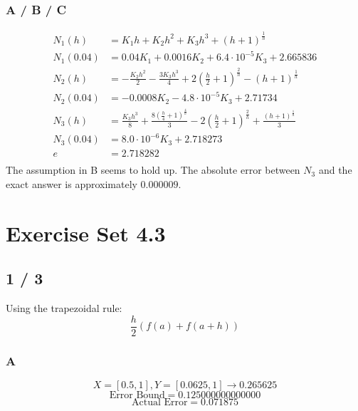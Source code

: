 \documentclass{oisinclass}
\begin{document}
\subsubsection*{A / B / C}
\begin{align*}
	N_1(h)    & = K_{1} h + K_{2} h^{2} + K_{3} h^{3} + \left(h + 1\right)^{\frac{1}{h}}                                                                                                     \\
	N_1(0.04) & = 0.04 K_{1} + 0.0016 K_{2} + 6.4 \cdot 10^{-5} K_{3} + 2.665836                                                                                                             \\
	N_2(h)    & = - \frac{K_{2} h^{2}}{2} - \frac{3 K_{3} h^{3}}{4} + 2 \left(\frac{h}{2} + 1\right)^{\frac{2}{h}} - \left(h + 1\right)^{\frac{1}{h}}                                        \\
	N_2(0.04) & = - 0.0008 K_{2} - 4.8 \cdot 10^{-5} K_{3} + 2.71734                                                                                                                         \\
	N_3(h)    & = \frac{K_{3} h^{3}}{8} + \frac{8 \left(\frac{h}{4} + 1\right)^{\frac{4}{h}}}{3} - 2 \left(\frac{h}{2} + 1\right)^{\frac{2}{h}} + \frac{\left(h + 1\right)^{\frac{1}{h}}}{3} \\
	N_3(0.04) & = 8.0 \cdot 10^{-6} K_{3} + 2.718273                                                                                                                                         \\
	e         & = 2.718282                                                                                                                                                                   \\
\end{align*}
The assumption in B seems to hold up. The absolute error between \(N_3\) and the exact answer is approximately \(0.000009\).

\section*{Exercise Set 4.3}
\subsection*{1 / 3}
Using the trapezoidal rule:
\[
	\frac{h}{2}\left(f(a) + f(a+h)\right)
\]
\subsubsection*{A}
\[X = [0.5, 1], Y = [0.0625, 1] \rightarrow 0.265625\]
\[
	\text{Error Bound} =  0.125000000000000
\]
\[
	\text{Actual Error} =  0.071875
\]
\end{document}
